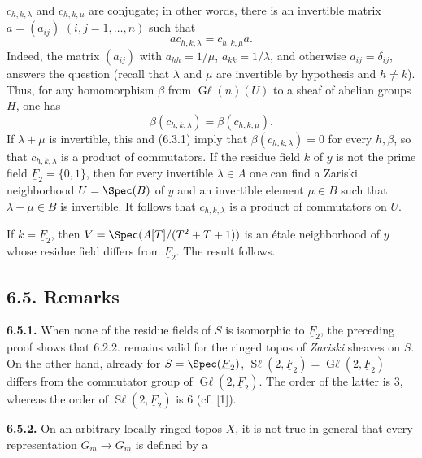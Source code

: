 \(c_{h,k,\lambda}\) and \(c_{h,k,\mu}\) are conjugate; in other words, there is an invertible matrix \(a=(a_{ij})\) \((i,j=1,\ldots,n)\) such that
\[
 ac_{h,k,\lambda}=c_{h,k,\mu}a.
\]
Indeed, the matrix \((a_{ij})\) with \(a_{hh}=1/\mu\), \(a_{kk}=1/\lambda\), and otherwise \(a_{ij}=\delta_{ij}\), answers the question (recall that \(\lambda\) and \(\mu\) are invertible by hypothesis and \(h\ne k\)). Thus, for any homomorphism \(\beta\) from \(\operatorname{G\ell}(n)(U)\) to a sheaf of abelian groups \(H\), one has
\[
 \beta(c_{h,k,\lambda})=\beta(c_{h,k,\mu}).
\]
If \(\lambda+\mu\) is invertible, this and (6.3.1) imply that \(\beta(c_{h,k,\lambda})=0\) for every \(h,\beta\), so that \(c_{h,k,\lambda}\) is a product of commutators. If the residue field \(k\) of \(y\) is not the prime field \(\underline{F}_2=\{0,1\}\), then for every invertible \(\lambda\in A\) one can find a Zariski neighborhood \(U=\Spec(B)\) of \(y\) and an invertible element \(\mu\in B\) such that \(\lambda+\mu\in B\) is invertible. It follows that \(c_{h,k,\lambda}\) is a product of commutators on \(U\).

If \(k=\underline{F}_2\), then \(V=\Spec(A[T]/(T^2+T+1))\) is an étale neighborhood of \(y\) whose residue field differs from \(\underline{F}_2\). The result follows.

\subsection*{6.5. Remarks}
\textbf{6.5.1.} When none of the residue fields of \(S\) is isomorphic to \(\underline{F}_2\), the preceding proof shows that 6.2.2. remains valid for the ringed topos of \emph{Zariski} sheaves on \(S\). On the other hand, already for \(S=\Spec(\underline{F}_2)\), \(\operatorname{S\ell}(2,\underline{F}_2)=\operatorname{G\ell}(2,\underline{F}_2)\) differs from the commutator group of \(\operatorname{G\ell}(2,\underline{F}_2)\). The order of the latter is \(3\), whereas the order of \(\operatorname{S\ell}(2,\underline{F}_2)\) is \(6\) (cf. [1]).

\textbf{6.5.2.} On an arbitrary locally ringed topos \(X\), it is not true in general that every representation \(G_m\to G_m\) is defined by a
